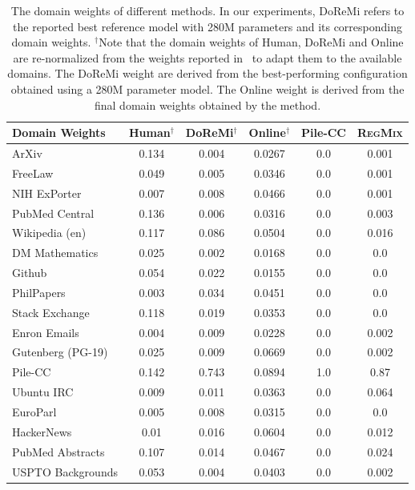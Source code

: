 \documentclass{article}
\theoremstyle{definition}
\theoremstyle{remark}
\newcommand{\ourmethod}{\textsc{RegMix}\xspace}
\begin{document}
\begin{table}[t]
    \centering
    \caption{The domain weights of different methods. In our experiments, DoReMi refers to the reported best reference model with 280M parameters and its corresponding domain weights. $^\dagger$Note that the domain weights of Human, DoReMi and Online are re-normalized from the weights reported in~\citet{xie2023doremi} to adapt them to the available domains. The DoReMi weight are derived from the best-performing configuration obtained using a 280M parameter model. The Online weight is derived from the final domain weights obtained by the method.}
    \label{tab:data_mixture_all}
\begin{threeparttable}
    \begin{tabular}{l|ccccc}
    \toprule
        \textbf{Domain Weights} & \textbf{Human}$^\dagger$ & \textbf{DoReMi}$^\dagger$ & \textbf{Online}$^\dagger$ & \textbf{Pile-CC} & \textbf{\ourmethod} \\
        \midrule
        ArXiv & 0.134  & 0.004  & 0.0267 & 0.0 & 0.001 \\ 
        FreeLaw & 0.049  & 0.005  & 0.0346 & 0.0 & 0.001 \\ 
        NIH ExPorter & 0.007  & 0.008  & 0.0466 & 0.0 & 0.001 \\ 
        PubMed Central & 0.136  & 0.006  & 0.0316 & 0.0 & 0.003 \\ 
        Wikipedia (en) & 0.117  & 0.086  & 0.0504 & 0.0 & 0.016 \\ 
        DM Mathematics & 0.025  & 0.002  & 0.0168 & 0.0 & 0.0 \\ 
        Github & 0.054  & 0.022  & 0.0155 & 0.0  & 0.0 \\ 
        PhilPapers & 0.003  & 0.034  & 0.0451 & 0.0 & 0.0 \\ 
        Stack Exchange & 0.118  & 0.019  & 0.0353 & 0.0 & 0.0 \\ 
        Enron Emails & 0.004  & 0.009  & 0.0228 &  0.0 & 0.002 \\ 
        Gutenberg (PG-19) & 0.025  & 0.009  & 0.0669 & 0.0 & 0.002 \\ 
        Pile-CC & 0.142  & 0.743 & 0.0894 & 1.0 & {0.87} \\ 
        Ubuntu IRC & 0.009  & 0.011  & 0.0363 & 0.0 & {0.064} \\ 
        EuroParl & 0.005  & 0.008  & 0.0315 & 0.0 & 0.0 \\ 
        HackerNews & 0.01  & 0.016  & 0.0604 & 0.0 & {0.012} \\ 
        PubMed Abstracts & 0.107  & 0.014 & 0.0467 & 0.0 & {0.024} \\ 
        USPTO Backgrounds & 0.053 & 0.004 & 0.0403 & 0.0 & 0.002 \\
    \bottomrule
    \end{tabular}
    \end{threeparttable}
\end{table}
\end{document}

